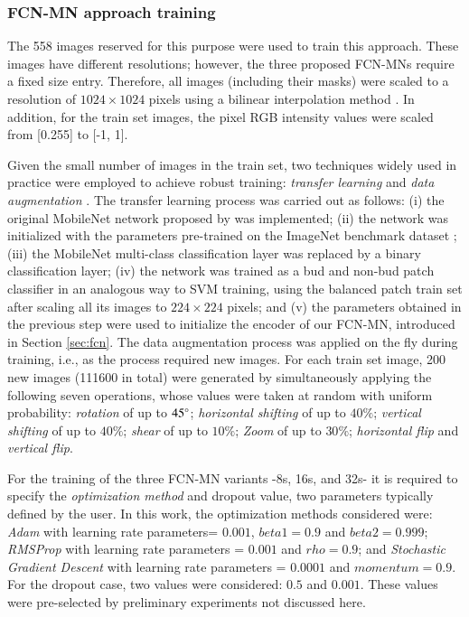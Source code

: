 \documentclass[a4paper,authoryear,review]{elsarticle}
\begin{document}
	\subsubsection{FCN-MN approach training}
	\label{sec:fcntrain}
	
	The 558 images reserved for this purpose were used to train this approach. These images have different resolutions; however, the three proposed FCN-MNs require a fixed size entry. Therefore, all images (including their masks) were scaled to a resolution of $1024 \times 1024$ pixels using a bilinear interpolation method \citep{han2013comparison}. In addition, for the train set images, the pixel RGB intensity values were scaled from [0.255] to [-1, 1].
	
	Given the small number of images in the train set, two techniques widely used in practice were employed to achieve robust training: \emph{transfer learning} \citet{pan2009survey} and \emph{data augmentation} \citet{shorten2019survey}. The transfer learning process was carried out as follows: (i) the original  MobileNet network proposed by \citet{howard2017mobilenets} was implemented; (ii) the network was initialized with the parameters pre-trained on the ImageNet benchmark dataset \citet{kornblith2019better}; (iii) the MobileNet multi-class classification layer was replaced by a binary classification layer; (iv) the network was trained as a bud and non-bud patch classifier in an analogous way to SVM training, using the balanced patch train set after scaling all its images to $224 \times 224$ pixels; and (v) the parameters obtained in the previous step were used to initialize the encoder of our FCN-MN, introduced in Section \ref{sec:fcn}. The data augmentation process was applied on the fly during training, i.e., as the process required new images. For each train set image, 200 new images (111600 in total) were generated by simultaneously applying the following seven operations, whose values were taken at random with uniform probability: \emph{rotation} of up to $45\degree$; \emph{horizontal shifting} of up to $40\%$; \emph{vertical shifting} of up to $40\%$; \emph{shear} of up to $10\%$; \emph{Zoom} of up to $30\%$;  \emph{horizontal flip} and \emph{vertical flip}. 
	
	For the training of the three  FCN-MN variants -8s, 16s, and 32s- it is required to specify the \emph{optimization method} and dropout value, two parameters typically defined by the user. In this work, the optimization methods considered were: \emph{Adam} with learning rate parameters= $0.001$, $beta1 = 0.9$ and $beta2 = 0.999$; \emph{RMSProp} with learning rate parameters = $0.001$ and $rho = 0.9$; and \emph{Stochastic Gradient Descent} with learning rate parameters = $0.0001$ and $momentum = 0.9$. For the dropout case, two values were considered: $0.5$ and $0.001$. These values were pre-selected by preliminary experiments not discussed here.
	
\end{document}
